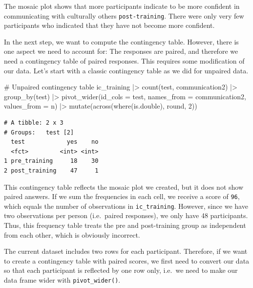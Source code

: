 \documentclass[
  letterpaper,
]{krantz}
\makeatletter
\newenvironment{Shaded}{\begin{snugshade}}{\end{snugshade}}
\newcommand{\AttributeTok}[1]{\textcolor[rgb]{0.40,0.45,0.13}{#1}}
\newcommand{\CommentTok}[1]{\textcolor[rgb]{0.37,0.37,0.37}{#1}}
\newcommand{\DecValTok}[1]{\textcolor[rgb]{0.68,0.00,0.00}{#1}}
\newcommand{\FunctionTok}[1]{\textcolor[rgb]{0.28,0.35,0.67}{#1}}
\newcommand{\NormalTok}[1]{\textcolor[rgb]{0.00,0.23,0.31}{#1}}
\newcommand{\SpecialCharTok}[1]{\textcolor[rgb]{0.37,0.37,0.37}{#1}}
\newenvironment{kframe}{%
\medskip{}
\setlength{\fboxsep}{.8em}
 \def\at@end@of@kframe{}%
 \ifinner\ifhmode%
  \def\at@end@of@kframe{\end{minipage}}%
  \begin{minipage}{\columnwidth}%
 \fi\fi%
 \def\FrameCommand##1{\hskip\@totalleftmargin \hskip-\fboxsep
 \colorbox{shadecolor}{##1}\hskip-\fboxsep
     \hskip-\linewidth \hskip-\@totalleftmargin \hskip\columnwidth}%
 \MakeFramed {\advance\hsize-\width
   \@totalleftmargin\z@ \linewidth\hsize
   \@setminipage}}%
 {\par\unskip\endMakeFramed%
 \at@end@of@kframe}
\renewenvironment{Shaded}{\begin{kframe}}{\end{kframe}}
\makeatother
\begin{document}
The mosaic plot shows that more participants indicate to be more
confident in communicating with culturally others
\texttt{post-training}. There were only very few participants who
indicated that they have not become more confident.

In the next step, we want to compute the contingency table. However,
there is one aspect we need to account for: The responses are paired,
and therefore we need a contingency table of paired responses. This
requires some modification of our data. Let's start with a classic
contingency table as we did for unpaired data.

\begin{Shaded}
\begin{Highlighting}[]
\CommentTok{\# Unpaired contingency table}
\NormalTok{ic\_training }\SpecialCharTok{|\textgreater{}}
  \FunctionTok{count}\NormalTok{(test, communication2) }\SpecialCharTok{|\textgreater{}}
  \FunctionTok{group\_by}\NormalTok{(test) }\SpecialCharTok{|\textgreater{}}
  \FunctionTok{pivot\_wider}\NormalTok{(}\AttributeTok{id\_cols =}\NormalTok{ test,}
              \AttributeTok{names\_from =}\NormalTok{ communication2,}
              \AttributeTok{values\_from =}\NormalTok{ n) }\SpecialCharTok{|\textgreater{}}
  \FunctionTok{mutate}\NormalTok{(}\FunctionTok{across}\NormalTok{(}\FunctionTok{where}\NormalTok{(is.double), round, }\DecValTok{2}\NormalTok{))}
\end{Highlighting}
\end{Shaded}

\begin{verbatim}
# A tibble: 2 x 3
# Groups:   test [2]
  test            yes    no
  <fct>         <int> <int>
1 pre_training     18    30
2 post_training    47     1
\end{verbatim}

This contingency table reflects the mosaic plot we created, but it does
not show paired answers. If we sum the frequencies in each cell, we
receive a score of \texttt{96}, which equals the number of observations
in \texttt{ic\_training}. However, since we have two observations per
person (i.e.~paired responses), we only have 48 participants. Thus, this
frequency table treats the pre and post-training group as independent
from each other, which is obviously incorrect.

The current dataset includes two rows for each participant. Therefore,
if we want to create a contingency table with paired scores, we first
need to convert our data so that each participant is reflected by one
row only, i.e.~we need to make our data frame wider with
\texttt{pivot\_wider()}.
\end{document}
